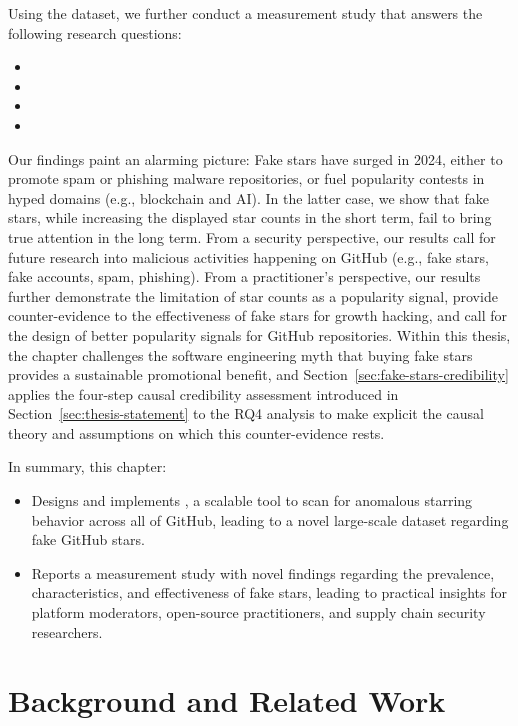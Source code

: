 Using the dataset, we further conduct a measurement study that answers the following research questions:
\begin{itemize}[leftmargin=15pt]%
    \item \RQOne
    \item \RQTwo
    \item \RQThree
    \item \RQFour
\end{itemize}

Our findings paint an alarming picture: Fake stars have surged in 2024, either to promote spam or phishing malware repositories, or fuel popularity contests in hyped domains (e.g., blockchain and AI). 
In the latter case, we show that fake stars, while increasing the displayed star counts in the short term, fail to bring true attention in the long term.
From a security perspective, our results call for future research into malicious activities happening on GitHub (e.g., fake stars, fake accounts, spam, phishing).
From a practitioner's perspective, our results further demonstrate the limitation of star counts as a popularity signal, provide counter-evidence to the effectiveness of fake stars for growth hacking, and call for the design of better popularity signals for GitHub repositories.
Within this thesis, the chapter challenges the software engineering myth that buying fake stars provides a sustainable promotional benefit, and Section~\ref{sec:fake-stars-credibility} applies the four-step causal credibility assessment introduced in Section~\ref{sec:thesis-statement} to the RQ4 analysis to make explicit the causal theory and assumptions on which this counter-evidence rests.

In summary, this chapter:
\begin{itemize}[leftmargin=15pt]
    \item Designs and implements \SystemName, a scalable tool to scan for anomalous starring behavior across all of GitHub, leading to a novel large-scale dataset regarding fake GitHub stars.
    \item Reports a measurement study with novel findings regarding the prevalence, characteristics, and effectiveness of fake stars, leading to practical insights for platform moderators, open-source practitioners, and supply chain security researchers.
\end{itemize}

\section{Background and Related Work}

